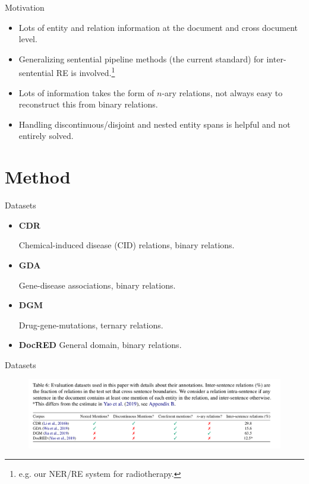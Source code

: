 \documentclass[usenames,dvipsnames,pdf]{beamer}
\begin{document}
        \begin{frame}{Motivation}
          \begin{itemize}
          \item
            Lots of entity and relation information at the document and cross document level.
          \item
            Generalizing sentential pipeline methods (the current standard)
            for inter-sentential RE is involved.\footnote{e.g. our NER/RE system for radiotherapy.}
          \item
            Lots of information takes the form of $n$-ary relations, not always easy to reconstruct this from binary relations.
          \item
            Handling discontinuous/disjoint and nested entity spans is helpful and not entirely solved.
          \end{itemize}
        \end{frame}
        
        \section{Method}


        \begin{frame}{Datasets}
          \begin{itemize}
          \item \textbf{CDR}


            Chemical-induced disease (CID) relations, binary relations.   
          \item \textbf{GDA}


            Gene-disease associations, binary relations.  
          \item \textbf{DGM}

            Drug-gene-mutations, ternary relations.   
          \item \textbf{DocRED}
            General domain, binary relations.
            
          \end{itemize}
        \end{frame}

        \begin{frame}{Datasets}
          \begin{figure}
            \includegraphics[width=1.0\textwidth,height=1.0\textheight,keepaspectratio]{datasetinfo} 
          \end{figure}
        \end{frame}
       
\end{document}

